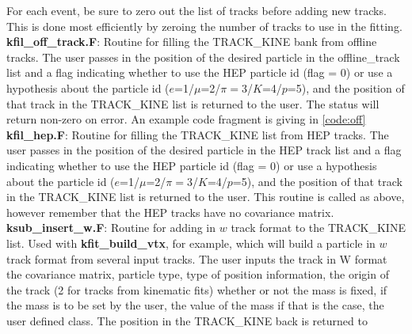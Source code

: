 For each event, be sure to zero out the list of tracks before adding
new tracks.  This is done most efficiently by zeroing  
the number of tracks to use in the fitting.\newline\newline
{\bf kfil\_off\_track.F}: Routine for filling the {\small TRACK\_KINE} bank 
                    from offline
                    tracks.  The user passes in the position of the 
                    desired particle in the offline\_track list and 
                    a flag indicating whether to use the {\small HEP}
                     particle
                    id (flag = 0) or use a hypothesis about the particle
                    id ($e$=1/$\mu$=2/$\pi=3$/$K$=4/$p$=5),
                    and the position of that
                    track in the {\small TRACK\_KINE} list is returned to the
                    user. The status will return non-zero on error.
                    An example code fragment is giving in \ref{code:off}
                    \nextline\nextline
{\bf kfil\_hep.F}:      Routine for filling the {\small TRACK\_KINE} list from 
                    {\small HEP}
                    tracks.  The user passes in the position of the 
                    desired particle in the {\small HEP} track list and 
                    a flag indicating whether to use the {\small HEP} particle
                    id (flag = 0) or use a hypothesis about the particle
                    id ($e$=1/$\mu$=2/$\pi=3$/$K$=4/$p$=5), 
                    and the position of that
                    track in the {\small TRACK\_KINE} list is returned to 
                    the user. This routine is
                    called as above, however remember that the {\small HEP}
                    tracks
                    have no covariance matrix.\nextline \nextline
{\bf ksub\_insert\_w.F}:  Routine for adding in $w$ track format to the 
                    {\small TRACK\_KINE}
                    list.  Used with {\bf kfit\_build\_vtx}, for example, 
                    which
                    will build a particle in $w$ track format from several
                    input tracks.  The user inputs the track in W format
                    the covariance matrix, particle type, type of position
                    information,  the origin of the track (2 for tracks
                    from kinematic fits) whether or not the mass is fixed, if 
                    the mass is to be set by the user, the value of the
                    mass if that is the case, the user defined class.  The
                    position in the {\small TRACK\_KINE} back is returned to 
